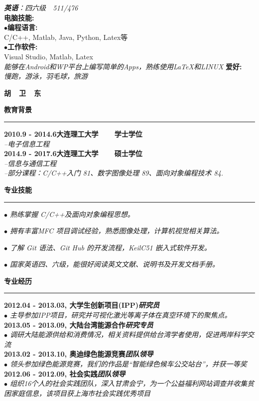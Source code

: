 \documentclass[a4paper,12pt,final]{memoir}
\newcommand{\myThemeColor}{RoyalBlue}
\newcommand{\SmallSep}{\vspace{0.9em}}
\newcommand{\CVSection}[1]
	{\Large\textbf{#1}\par
	\vspace{0.2cm}\normalsize\normalfont}
\newcommand{\CVItem}[1]
	{\textbf{\color{\myThemeColor} #1}}
\begin{document}
\begin{CJK*}{UTF8}{gbsn}
\begin{flushright}
	\textit{\textbf{英语}：四六级~~511/476}\\
	\SmallSep
\SmallSep
\SmallSep
	\CVItem{{\large 电脑技能:}}\\
    \SmallSep
	$\bullet$\textbf{编程语言:}\\ C/C++, Matlab, Java, Python, Latex等\\
	\SmallSep
    $\bullet$\textbf{工作软件:}\\ Visual Studio, Matlab, Latex\\
	\SmallSep
	\textit{能够在Android和WP平台上编写简单的Apps，熟练使用\LaTeX 和LINUX}
	\SmallSep
\SmallSep
\SmallSep
	\CVItem{{\large 爱好:}}\\
\SmallSep
	\textit{慢跑，游泳，羽毛球，旅游 }
	\SmallSep
\end{flushright}\normalsize
\framebreak


\Huge\bfseries {\color{\myThemeColor} 胡~~卫~~东}\\
\normalsize\normalfont

\CVSection{教育背景}
\hrule
\SmallSep
\CVItem{2010.9 - 2014.6\hfill\textsc{大连理工大学~~~~学士学位}}\\
\textit{--电子信息工程}\\
\CVItem{2014.9 - 2017.6\hfill\textsc{大连理工大学~~~~硕士学位}}\\
\textit{--信息与通信工程}\\
\textit{--部分课程：C/C++入门 81、数字图像处理 89、面向对象编程技术 84. }

\CVSection{专业技能}
\hrule
\SmallSep

\textit{$\bullet$ 熟练掌握 C/C++及面向对象编程思想。}

\textit{$\bullet$ 拥有丰富MFC 项目调试经验，熟悉图像处理，计算机视觉相关算法。}

\textit{$\bullet$ 了解 Git 语法、Git Hub 的开发流程，KeilC51 嵌入式软件开发。 }

\textit{$\bullet$ 国家英语四、六级，能很好阅读英文文献、说明书及开发文档手册。}

\CVSection{专业经历}
\hrule
\SmallSep
\CVItem{2012.04 - 2013.03, 大学生创新项目(IPP)\hfill\emph{研究员}}\\
\textit{$\bullet$ 主导参加IPP项目，研究并可视化激光等离子体在真空环境下的聚焦点。}
\\
\CVItem{2013.05 - 2013.09, 大陆台湾能源合作\hfill\emph{研究专员}}\\
\textit{$\bullet$ 调研大陆能源供给和消费情况，相关资料提供给台湾学者使用，促进两岸科学交流}
\\
\CVItem{2013.02 - 2013.10, 奥迪绿色能源竞赛\hfill\emph{团队领导}}\\
\textit{$\bullet$ 领头参加绿色能源竞赛，我们的作品是“智能绿色候车公交站台”，并获一等奖}
\\
\CVItem{2012.06 - 2012.09, 社会实践\hfill\emph{团队领导}}\\
\textit{$\bullet$ 组织16个人的社会实践团队，深入甘肃会宁，为一个公益福利网站调查并收集贫困家庭信息，该项目获上海市社会实践优秀项目}


\end{CJK*}
\end{document}
